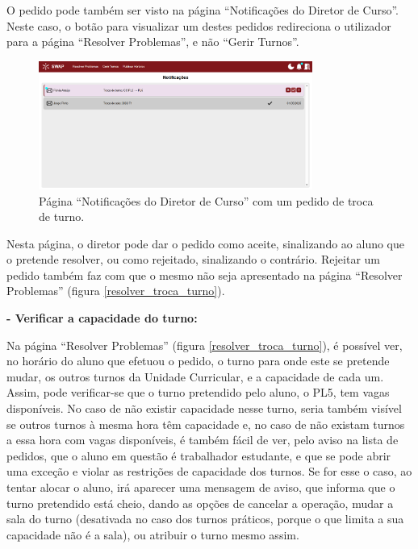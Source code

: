 \documentclass[12pt, a4paper]{article}
\begin{document}
O pedido pode também ser visto na página ``Notificações do Diretor de Curso''. Neste caso, o botão
para visualizar um destes pedidos redireciona o utilizador para a página ``Resolver Problemas'', e
não ``Gerir Turnos''.

\begin{figure}[H]
    \centering
    \includegraphics[width=0.8\textwidth]{res/manual/notificacao_troca_turno.png}
    \caption{Página ``Notificações do Diretor de Curso'' com um pedido de troca de turno.}
    \label{notificacao_troca_turno}
\end{figure}

Nesta página, o diretor pode dar o pedido como aceite, sinalizando ao aluno que o pretende resolver,
ou como rejeitado, sinalizando o contrário. Rejeitar um pedido também faz com que o mesmo não
seja apresentado na página ``Resolver Problemas'' (figura \ref{resolver_troca_turno}).

\textbf{- Verificar a capacidade do turno:}

Na página ``Resolver Problemas'' (figura \ref{resolver_troca_turno}), é possível ver, no horário do
aluno que efetuou o pedido, o turno para onde este se pretende mudar, os outros turnos da Unidade
Curricular, e a capacidade de cada um. Assim, pode verificar-se que o turno pretendido pelo aluno, o
PL5, tem vagas disponíveis. No caso de não existir capacidade nesse turno, seria também visível se
outros turnos à mesma hora têm capacidade e, no caso de não existam turnos a essa hora com vagas
disponíveis, é também fácil de ver, pelo aviso na lista de pedidos, que o aluno em questão é
trabalhador estudante, e que se pode abrir uma exceção e violar as restrições de capacidade dos
turnos. Se for esse o caso, ao tentar alocar o aluno, irá aparecer uma mensagem de aviso, que
informa que o turno pretendido está cheio, dando as opções de cancelar a operação, mudar a sala
do turno (desativada no caso dos turnos práticos, porque o que limita a sua capacidade não é a
sala), ou atribuir o turno mesmo assim.
\end{document}
